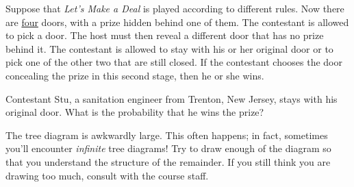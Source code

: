 \documentclass[12pt,twoside]{article}
\begin{document}
\begin{problem}


Suppose that {\em Let's Make a Deal} is played according to different
rules.  Now there are \underline{four} doors, with a prize hidden
behind one of them.  The contestant is allowed to pick a door.  The
host must then reveal a different door that has no prize behind it.
The contestant is allowed to stay with his or her original door or to
pick one of the other two that are still closed.  If the contestant
chooses the door concealing the prize in this second stage, then he or
she wins.

\bparts
\ppart 
Contestant Stu, a sanitation engineer from Trenton, New Jersey,
stays with his original door.  What is the probability that he wins
the prize?

The tree diagram is awkwardly large.  This often happens; in fact,
sometimes you'll encounter \textit{infinite} tree diagrams!  Try to
draw enough of the diagram so that you understand the structure of the
remainder.  If you still think you 
are drawing too much, consult with the course staff.



\end{problem}
\end{document}
